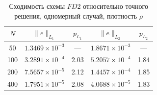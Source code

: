 \documentclass[a4paper,14pt]{extarticle}
\theoremstyle{theorem}
\theoremstyle{lemma}
\begin{document}

\begin{table}[!htbp]
\centering
\caption{Сходимость схемы $FD2$ относительно точного решения, одномерный случай, плотность $\rho$}
\vspace{0.1cm}
\label{tab:conv_fd2_1d}
\begin{tabular}{ccccc}
\toprule
$N$ & $\|e\|_{L_1}$ & $p_{L_1}$ & $\|e\|_{L_2}$ & $p_{L_2}$ \\
\midrule
50  & $1.3469\times 10^{-3}$ & ---  & $1.8671\times 10^{-3}$ & ---  \\
100 & $3.2891\times 10^{-4}$ & 2.03 & $5.2057\times 10^{-4}$ & 1.84 \\
200 & $7.5657\times 10^{-5}$ & 2.12 & $1.4457\times 10^{-4}$ & 1.85 \\
400 & $1.7951\times 10^{-5}$ & 2.08 & $4.0688\times 10^{-5}$ & 1.83 \\
\bottomrule
\end{tabular}
\end{table}

\end{document}
